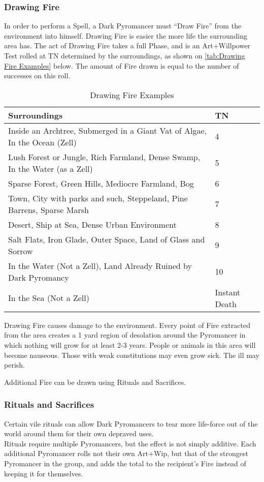 \documentclass[oneside,11pt,english]{book}
\begin{document}
\subsubsection{Drawing Fire}
In order to perform a Spell, a Dark Pyromancer must “Draw Fire” from the environment into 
himself. Drawing Fire is easier the more life the surrounding area has. The act of Drawing Fire 
takes a full Phase, and is an Art+Willpower Test rolled at TN determined by the surroundings, 
as shown on \autoref{tab:Drawing Fire Examples} below. The amount of Fire drawn is equal to the number of successes on this roll. 
\begin{table}[ht]
  \centering
  \caption{Drawing Fire Examples}
  \label{tab:Drawing Fire Examples}
  \begin{tabu} spread 0pt {XX[-1]}
    Surroundings&TN\\\toprule
    Inside an Archtree, Submerged in a Giant  Vat of Algae, In the Ocean (Zell)  &4  \\
    Lush Forest or Jungle, Rich Farmland,  Dense Swamp, In the Water (as a Zell) &5  \\
    Sparse Forest, Green Hills, Mediocre  Farmland, Bog &6  \\
    Town, City with parks and such, Steppeland,  Pine Barrens, Sparse Marsh  &7  \\
    Desert, Ship at Sea, Dense Urban  Environment  &8  \\
    Salt Flats, Iron Glade, Outer Space, Land  of Glass and Sorrow &9\\
    In the Water (Not a Zell), Land Already Ruined by Dark Pyromancy  &10\\
    In the Sea (Not a Zell)  &Instant Death  \\
  \end{tabu}
\end{table}
Drawing Fire causes damage to the environment. Every point of Fire extracted from the area 
creates a 1 yard region of desolation around the Pyromancer in which nothing will grow for at 
least 2-3 years. People or animals in this area will become nauseous. Those with weak 
constitutions may even grow sick. The ill may perish. 

Additional Fire can be drawn using Rituals and Sacrifices. 

\subsubsection{Rituals and Sacrifices}
Certain vile rituals can allow Dark Pyromancers to tear more life-force out of the world around 
them for their own depraved uses.\\
Rituals require multiple Pyromancers, but the effect is not simply additive. Each additional 
Pyromancer rolls not their own Art+Wip, but that of the strongest Pyromancer in the group, and 
adds the total to the recipient’s Fire instead of keeping it for themselves. 
\end{document}
